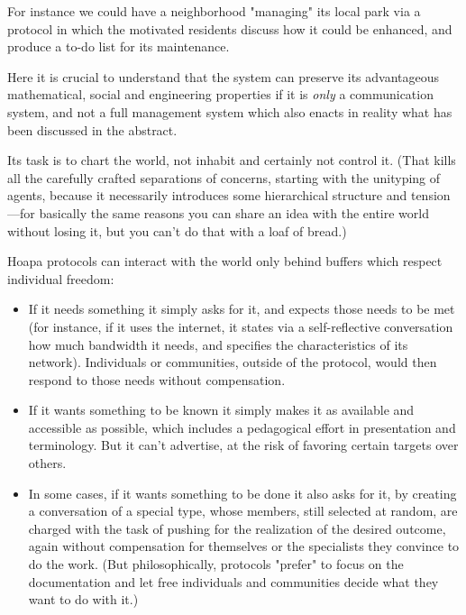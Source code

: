 \documentclass[11pt]{article}
\begin{document}
For instance we could have a neighborhood "managing" its local park via a protocol in which the motivated residents discuss how it could be enhanced, and produce a to-do list for its maintenance.

Here it is crucial to understand that the system can preserve its advantageous mathematical, social and engineering properties if it is \emph{only} a communication system, and not a full management system which also enacts in reality what has been discussed in the abstract.

Its task is to chart the world, not inhabit and certainly not control it. (That kills all the carefully crafted separations of concerns, starting with the unityping of agents, because it necessarily introduces some hierarchical structure and tension---for basically the same reasons you can share an idea with the entire world without losing it, but you can't do that with a loaf of bread.)

Hoapa protocols can interact with the world only behind buffers which respect individual freedom:

\begin{itemize}

\item If it needs something it simply asks for it, and expects those needs to be met (for instance, if it uses the internet, it states via a self-reflective conversation how much bandwidth it needs, and specifies the characteristics of its network). Individuals or communities, outside of the protocol, would then respond to those needs without compensation.

\item If it wants something to be known it simply makes it as available and accessible as possible, which includes a pedagogical effort in presentation and terminology. But it can't advertise, at the risk of favoring certain targets over others.

\item In some cases, if it wants something to be done it also asks for it, by creating a conversation of a special type, whose members, still selected at random, are charged with the task of pushing for the realization of the desired outcome, again without compensation for themselves or the specialists they convince to do the work. (But philosophically, protocols "prefer" to focus on the documentation and let free individuals and communities decide what they want to do with it.)

\end{itemize}
\end{document}
